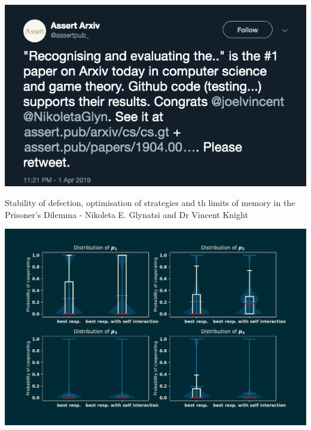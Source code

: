 \documentclass{beamer}
\begin{document}
\begin{frame}
    \centering
    \includegraphics[width=\textwidth]{static/tweet}
\end{frame}

\begin{frame}
    \begin{center}
        \vspace{-1cm}
        \normalsize{Stability of defection, optimisation of strategies and th
        limits of memory in the Prisoner's Dilemma - Nikoleta E. Glynatsi and
        Dr Vincent Knight}

        \vspace{1cm}
        
    \end{center}
\end{frame}

\begin{frame}
    \begin{center}
        \vspace{-1cm}
        \includegraphics[width=\textwidth]{static/result_self_interactions}
    \end{center}
\end{frame}
\end{document}
